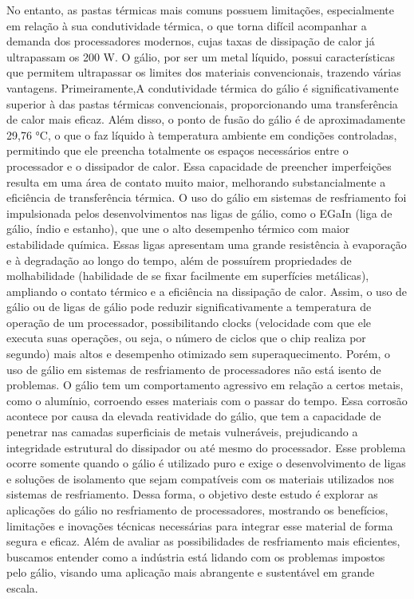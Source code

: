 \documentclass[12pt]{article}
\begin{document}
No entanto, as pastas térmicas mais comuns possuem limitações, especialmente em relação à sua condutividade térmica, o que torna difícil acompanhar a demanda dos processadores modernos, cujas taxas de dissipação de calor já ultrapassam os 200 W.
O gálio, por ser um metal líquido, possui características que permitem ultrapassar os limites dos materiais convencionais, trazendo várias vantagens. Primeiramente,A condutividade térmica do gálio é significativamente superior à das pastas térmicas convencionais, proporcionando uma transferência de calor mais eficaz. Além disso, o ponto de fusão do gálio é de aproximadamente 29,76 °C, o que o faz líquido à temperatura ambiente em condições controladas, permitindo que ele preencha totalmente os espaços necessários entre o processador e o dissipador de calor. Essa capacidade de preencher imperfeições resulta em uma área de contato muito maior, melhorando substancialmente a eficiência de transferência térmica.
O uso do gálio em sistemas de resfriamento foi impulsionada pelos desenvolvimentos nas ligas de gálio, como o EGaIn (liga de gálio, índio e estanho), que une o alto desempenho térmico com maior estabilidade química. Essas ligas apresentam uma grande resistência à evaporação e à degradação ao longo do tempo, além de possuírem propriedades de molhabilidade (habilidade de se fixar facilmente em superfícies metálicas), ampliando o contato térmico e a eficiência na dissipação de calor. Assim, o uso de gálio ou de ligas de gálio pode reduzir significativamente a temperatura de operação de um processador, possibilitando clocks (velocidade com que ele executa suas operações, ou seja, o número de ciclos que o chip realiza por segundo) mais altos e desempenho otimizado sem superaquecimento.
Porém, o uso de gálio em sistemas de resfriamento de processadores não está isento de problemas. O gálio tem um comportamento agressivo em relação a certos metais, como o alumínio, corroendo esses materiais com o passar do tempo. Essa corrosão acontece por causa da elevada reatividade do gálio, que tem a capacidade de penetrar nas camadas superficiais de metais vulneráveis, prejudicando a integridade estrutural do dissipador ou até mesmo do processador. Esse problema ocorre somente quando o gálio é utilizado puro e exige o desenvolvimento de ligas e soluções de isolamento que sejam compatíveis com os materiais utilizados nos sistemas de resfriamento.
Dessa forma, o objetivo deste estudo é explorar as aplicações do gálio no resfriamento de processadores, mostrando os benefícios, limitações e inovações técnicas necessárias para integrar esse material de forma segura e eficaz. Além de avaliar as possibilidades de resfriamento mais eficientes, buscamos entender como a indústria está lidando com os problemas impostos pelo gálio, visando uma aplicação mais abrangente e sustentável em grande escala.
\end{document}
